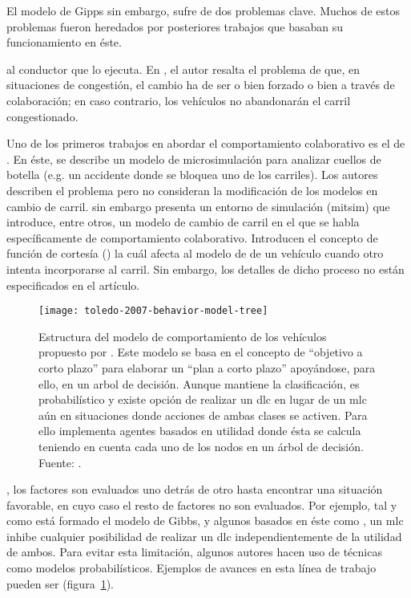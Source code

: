 El modelo de Gipps sin embargo, sufre de dos problemas clave. Muchos de estos problemas fueron heredados por posteriores trabajos que basaban su funcionamiento en éste.

 al conductor que lo ejecuta. En \cite{Hidas2002}, el autor resalta el problema de que, en situaciones de congestión, el cambio ha de ser o bien forzado o bien a través de colaboración; en caso contrario, los vehículos no abandonarán el carril congestionado.

Uno de los primeros trabajos en abordar el comportamiento colaborativo es el de \cite{Fritzsche1994}. En éste, se describe un modelo de microsimulación para analizar cuellos de botella (e.g. un accidente donde se bloquea uno de los carriles). Los autores describen el problema pero no consideran la modificación de los modelos en cambio de carril. \cite{Yang1996} sin embargo presenta un entorno de simulación (\gls{mitsim}) que introduce, entre otros, un modelo de cambio de carril en el que se habla específicamente de comportamiento colaborativo. Introducen el concepto de función de cortesía (\textit{}) la cuál afecta al modelo de \textit{} de un vehículo cuando otro intenta incorporarse al carril. Sin embargo, los detalles de dicho proceso no están especificados en el artículo.

\begin{figure}
	\texttt{[image: toledo-2007-behavior-model-tree]}
	\caption[Estructura del modelo de comportamiento propuesto por \cite{Toledo2007}]{Estructura del modelo de comportamiento de los vehículos propuesto por \cite{Toledo2007}. Este modelo se basa en el concepto de \enquote{objetivo a corto plazo} para elaborar un \enquote{plan a corto plazo} apoyándose, para ello, en un arbol de decisión. Aunque mantiene la clasificación, es probabilístico y existe opción de realizar un \gls{dlc} en lugar de un \gls{mlc} aún en situaciones donde acciones de ambas clases se activen. Para ello implementa agentes basados en utilidad donde ésta se calcula teniendo en cuenta cada uno de los nodos en un árbol de decisión. Fuente: \cite{Toledo2007}.}
	\label{fig:toledo-2007-behavior-model-tree}
\end{figure}

, los factores son evaluados uno detrás de otro hasta encontrar una situación favorable, en cuyo caso el resto de factores no son evaluados. Por ejemplo, tal y como está formado el modelo de Gibbs, y algunos basados en éste como \cite{Hidas2002}, un \gls{mlc} inhibe cualquier posibilidad de realizar un \gls{dlc} independientemente de la utilidad de ambos. Para evitar esta limitación, algunos autores hacen uso de técnicas como modelos probabilísticos. Ejemplos de avances en esta línea de trabajo pueden ser \cite{Toledo2003, Toledo2007, Wei2000} (figura~\ref{fig:toledo-2007-behavior-model-tree}).

